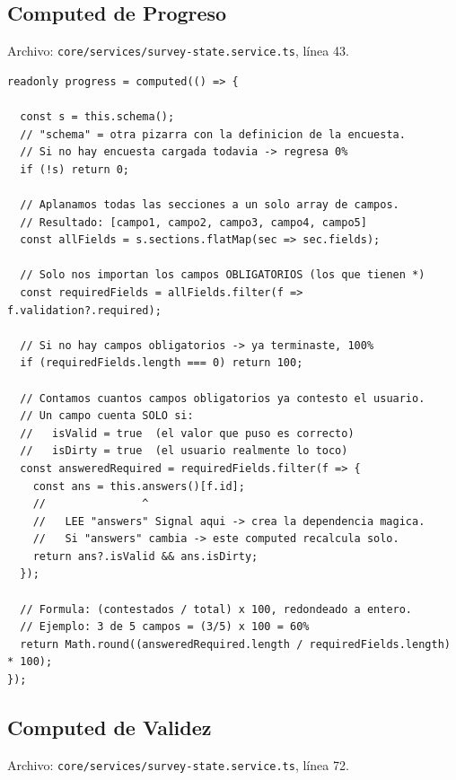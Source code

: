 \documentclass[12pt, a4paper]{article}
\begin{document}
\subsection{ Computed de Progreso}

Archivo: \textcolor{morado}{\texttt{core/services/survey-state.service.ts}}, línea 43.

\begin{lstlisting}
readonly progress = computed(() => {

  const s = this.schema();
  // "schema" = otra pizarra con la definicion de la encuesta.
  // Si no hay encuesta cargada todavia -> regresa 0%
  if (!s) return 0;

  // Aplanamos todas las secciones a un solo array de campos.
  // Resultado: [campo1, campo2, campo3, campo4, campo5]
  const allFields = s.sections.flatMap(sec => sec.fields);

  // Solo nos importan los campos OBLIGATORIOS (los que tienen *)
  const requiredFields = allFields.filter(f => f.validation?.required);

  // Si no hay campos obligatorios -> ya terminaste, 100%
  if (requiredFields.length === 0) return 100;

  // Contamos cuantos campos obligatorios ya contesto el usuario.
  // Un campo cuenta SOLO si:
  //   isValid = true  (el valor que puso es correcto)
  //   isDirty = true  (el usuario realmente lo toco)
  const answeredRequired = requiredFields.filter(f => {
    const ans = this.answers()[f.id];
    //               ^
    //   LEE "answers" Signal aqui -> crea la dependencia magica.
    //   Si "answers" cambia -> este computed recalcula solo.
    return ans?.isValid && ans.isDirty;
  });

  // Formula: (contestados / total) x 100, redondeado a entero.
  // Ejemplo: 3 de 5 campos = (3/5) x 100 = 60%
  return Math.round((answeredRequired.length / requiredFields.length) * 100);
});
\end{lstlisting}

\subsection{ Computed de Validez}

Archivo: \textcolor{morado}{\texttt{core/services/survey-state.service.ts}}, línea 72.
\end{document}
